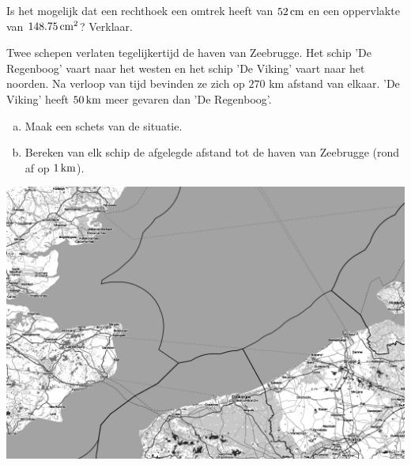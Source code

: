 \documentclass[12pt]{article}
\begin{document}
\begin{oefening}
Is het mogelijk dat een rechthoek een omtrek heeft van $52 \cm$ en een oppervlakte van $148.75\cm^2$? Verklaar.
\end{oefening}

\begin{oefening}
Twee schepen verlaten tegelijkertijd de haven van Zeebrugge. Het schip 'De Regenboog' vaart naar het westen en het schip 'De Viking' vaart naar het noorden. Na verloop van tijd bevinden ze zich op $270$ km afstand van elkaar. 'De Viking' heeft $50 \km$ meer gevaren dan 'De Regenboog'.
\begin{enumerate}[(a)]
  \item Maak een schets van de situatie.
  \item Bereken van elk schip de afgelegde afstand tot de haven van Zeebrugge (rond af op $1 \km$).
\end{enumerate}
\begin{center}
\includegraphics[width=\textwidth]{zeebrugge}
\end{center}
\end{oefening}
\end{document}
